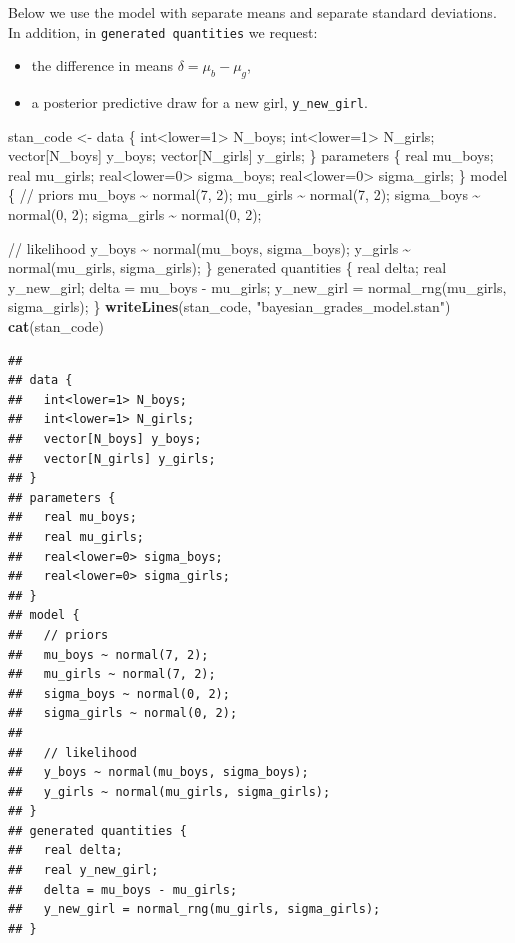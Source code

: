 \documentclass[
  12pt,
]{article}
\newenvironment{Shaded}{\begin{snugshade}}{\end{snugshade}}
\newcommand{\FunctionTok}[1]{\textcolor[rgb]{0.13,0.29,0.53}{\textbf{#1}}}
\newcommand{\NormalTok}[1]{#1}
\newcommand{\OtherTok}[1]{\textcolor[rgb]{0.56,0.35,0.01}{#1}}
\newcommand{\StringTok}[1]{\textcolor[rgb]{0.31,0.60,0.02}{#1}}
\providecommand{\tightlist}{%
  \setlength{\itemsep}{0pt}\setlength{\parskip}{0pt}}
\begin{document}
Below we use the model with separate means and separate standard
deviations. In addition, in \texttt{generated\ quantities} we request:

\begin{itemize}
\tightlist
\item
  the difference in means \(\delta = \mu_b - \mu_g\),
\item
  a posterior predictive draw for a new girl, \texttt{y\_new\_girl}.
\end{itemize}

\begin{Shaded}
\begin{Highlighting}[]
\NormalTok{stan\_code }\OtherTok{\textless{}{-}} \StringTok{\textquotesingle{}}
\StringTok{data \{}
\StringTok{  int\textless{}lower=1\textgreater{} N\_boys;}
\StringTok{  int\textless{}lower=1\textgreater{} N\_girls;}
\StringTok{  vector[N\_boys] y\_boys;}
\StringTok{  vector[N\_girls] y\_girls;}
\StringTok{\}}
\StringTok{parameters \{}
\StringTok{  real mu\_boys;}
\StringTok{  real mu\_girls;}
\StringTok{  real\textless{}lower=0\textgreater{} sigma\_boys;}
\StringTok{  real\textless{}lower=0\textgreater{} sigma\_girls;}
\StringTok{\}}
\StringTok{model \{}
\StringTok{  // priors}
\StringTok{  mu\_boys \textasciitilde{} normal(7, 2);}
\StringTok{  mu\_girls \textasciitilde{} normal(7, 2);}
\StringTok{  sigma\_boys \textasciitilde{} normal(0, 2);}
\StringTok{  sigma\_girls \textasciitilde{} normal(0, 2);}

\StringTok{  // likelihood}
\StringTok{  y\_boys \textasciitilde{} normal(mu\_boys, sigma\_boys);}
\StringTok{  y\_girls \textasciitilde{} normal(mu\_girls, sigma\_girls);}
\StringTok{\}}
\StringTok{generated quantities \{}
\StringTok{  real delta;}
\StringTok{  real y\_new\_girl;}
\StringTok{  delta = mu\_boys {-} mu\_girls;}
\StringTok{  y\_new\_girl = normal\_rng(mu\_girls, sigma\_girls);}
\StringTok{\}}
\StringTok{\textquotesingle{}}
\FunctionTok{writeLines}\NormalTok{(stan\_code, }\StringTok{"bayesian\_grades\_model.stan"}\NormalTok{)}
\FunctionTok{cat}\NormalTok{(stan\_code)}
\end{Highlighting}
\end{Shaded}

\begin{verbatim}
## 
## data {
##   int<lower=1> N_boys;
##   int<lower=1> N_girls;
##   vector[N_boys] y_boys;
##   vector[N_girls] y_girls;
## }
## parameters {
##   real mu_boys;
##   real mu_girls;
##   real<lower=0> sigma_boys;
##   real<lower=0> sigma_girls;
## }
## model {
##   // priors
##   mu_boys ~ normal(7, 2);
##   mu_girls ~ normal(7, 2);
##   sigma_boys ~ normal(0, 2);
##   sigma_girls ~ normal(0, 2);
## 
##   // likelihood
##   y_boys ~ normal(mu_boys, sigma_boys);
##   y_girls ~ normal(mu_girls, sigma_girls);
## }
## generated quantities {
##   real delta;
##   real y_new_girl;
##   delta = mu_boys - mu_girls;
##   y_new_girl = normal_rng(mu_girls, sigma_girls);
## }
\end{verbatim}
\end{document}
